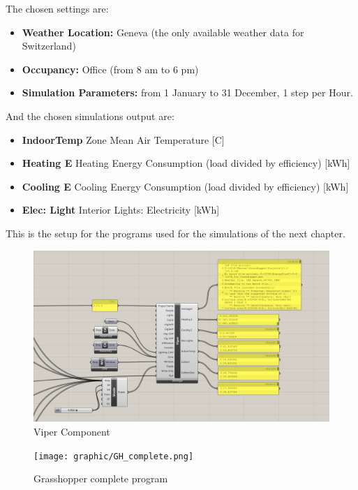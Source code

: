 The chosen settings are:
\begin{itemize}
\item \textbf{Weather Location:} Geneva (the only available weather data for Switzerland)
\item \textbf{Occupancy:} Office (from 8 am to 6 pm)
\item \textbf{Simulation Parameters:} from 1 January to 31 December, 1 step per Hour.
\end{itemize}
And the chosen simulations output are:
\begin{itemize}
\item \textbf{IndoorTemp} Zone Mean Air Temperature [C]
\item \textbf{Heating E} Heating Energy Consumption (load divided by efficiency) [kWh]
\item \textbf{Cooling E} Cooling Energy Consumption (load divided by efficiency) [kWh]
\item \textbf{Elec: Light} Interior Lights: Electricity [kWh]
\end{itemize}

This is the setup for the programs used for the simulations of the next chapter.

\begin{figure}[h]
 \centering
 \includegraphics[width=140mm]{graphic/GH_diva.jpg}
 \caption{Viper Component}
 \label{GH_diva}
\end{figure}

\begin{figure}[h]
 \centering
 \texttt{[image: graphic/GH\_complete.png]}
 \caption{Grasshopper complete program}
 \label{GH_complete}
\end{figure}